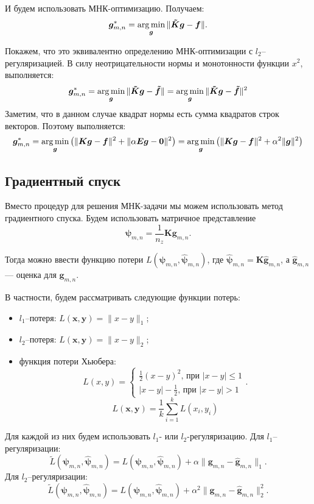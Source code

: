 \documentclass[../paper.tex]{subfiles}
\begin{document}
И будем использовать МНК-оптимизацию. Получаем:
\[
	\bm{g}_{m,n}^* = \operatorname*{arg\,min}_{\bm{g}} \| \bm{\tilde K} \bm{g} - \bm{f} \|
.\]

Покажем, что это эквивалентно определению МНК-оптимизации с $l_2$--регуляризацией.
В силу неотрицательности нормы и монотонности функции $x^2$, выполняется:
\[
	\bm{g}_{m,n}^* = \operatorname*{arg\,min}_{\bm{g}} \| \bm{\tilde K} \bm{g} - \bm{\tilde f} \|
	= \operatorname*{arg\,min}_{\bm{g}} \| \bm{\tilde K} \bm{g} - \bm{\tilde f} \|^2
\]
Заметим, что в данном случае квадрат нормы есть сумма квадратов строк векторов. Поэтому выполняется:
\[
	\bm{g}_{m,n}^* 
	= \operatorname*{arg\,min}_{\bm{g}} \left(\| \bm{K} \bm{g} - \bm{f} \|^2 + \| \alpha \bm{E} \bm{g} - \bm{0} \|^2\right)
	= \operatorname*{arg\,min}_{\bm{g}} \left(\| \bm{K} \bm{g} - \bm{f} \|^2 + \alpha^2 \| \bm{g} \|^2\right)
\]
%
\subsection{Градиентный спуск}
Вместо процедур для решения МНК-задачи мы можем использовать метод градиентного
спуска. Будем использовать матричное представление
\[
	\bm{\psi}_{m,n} = \frac{1}{n_z} \bm{K} \bm{g}_{m,n}
.\]

Тогда можно ввести функцию потери $L(\bm{\psi}_{m,n}, \bm{\hat{\psi}}_{m,n})$,
где $\bm{\hat{\psi}}_{m,n} = \bm{K} \bm{\hat{g}}_{m,n}$, а $\bm{\hat{g}}_{m,n}$ ---
оценка для $\bm{g}_{m,n}$.

В частности, будем рассматривать следующие функции потерь:
\begin{itemize}
\item $l_1$--потеря: $L(\bm{x}, \bm{y}) = \| x - y \|_1$;
\item $l_2$--потеря: $L(\bm{x}, \bm{y}) = \| x - y \|_2$;
\item функция потери Хьюбера:
  \[
    L(x, y) =
    \begin{cases}
      \frac{1}{2} (x-y)^2 \text{, при $|x-y| \leqslant 1$} \\
      |x-y| - \frac{1}{2} \text{, при $|x-y| > 1$}
    \end{cases}.
  \]
  \[
    L(\bm{x}, \bm{y}) = \frac{1}{k} \sum_{i=1}^k L(x_i, y_i)
  \]
\end{itemize}

Для каждой из них будем использовать $l_1$- или $l_2$-регуляризацию. Для $l_1$--регуляризации:
\[
	\tilde{L}(\bm{\psi}_{m,n}, \bm{\hat{\psi}}_{m,n}) = L(\bm{\psi}_{m,n}, \bm{\hat{\psi}}_{m,n}) + \alpha \| \bm{g}_{m,n} - \bm{\hat{g}}_{m,n} \|_1
.\]
Для $l_2$--регуляризации:
\[
	\tilde{L}(\bm{\psi}_{m,n}, \bm{\hat{\psi}}_{m,n}) = L(\bm{\psi}_{m,n}, \bm{\hat{\psi}}_{m,n}) + \alpha^2 \| \bm{g}_{m,n} - \bm{\hat{g}}_{m,n} \|_2^2
.\]
\end{document}
